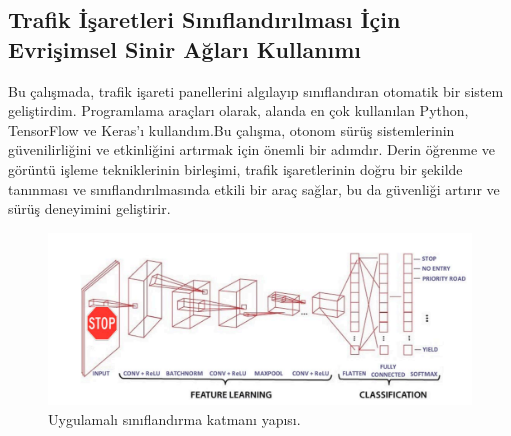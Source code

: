 \documentclass{article}
\begin{document}
\subsection{Trafik İşaretleri Sınıflandırılması İçin Evrişimsel Sinir Ağları Kullanımı}
Bu çalışmada, trafik işareti panellerini algılayıp sınıflandıran otomatik bir sistem geliştirdim. Programlama araçları olarak, alanda en çok kullanılan Python, TensorFlow ve Keras'ı kullandım.Bu çalışma, otonom sürüş sistemlerinin güvenilirliğini ve etkinliğini artırmak için önemli bir adımdır. Derin öğrenme ve görüntü işleme tekniklerinin birleşimi, trafik işaretlerinin doğru bir şekilde tanınması ve sınıflandırılmasında etkili bir araç sağlar, bu da güvenliği artırır ve sürüş deneyimini geliştirir.\\[3pt]
\begin{figure}[h]
  \centering
  \includegraphics[width=1\textwidth]{image/Resim52.PNG} %
\caption{Uygulamalı sınıflandırma katmanı yapısı.\cite{ferencz2024neural}}
  \label{fig:cnnmimari}  
\end{figure}
\end{document}
